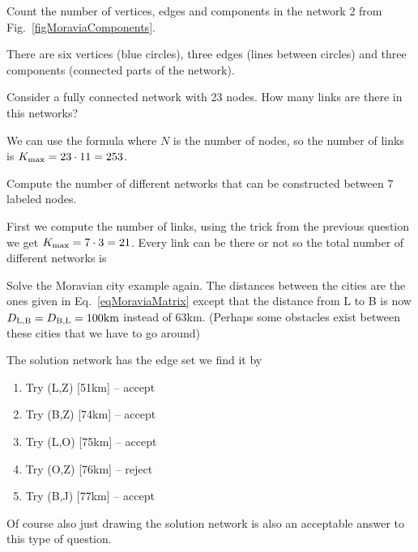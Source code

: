 

Count the number of vertices, edges and components in the network 2 from Fig.~\ref{figMoraviaComponents}. 

\solution
There are six vertices (blue circles), three edges (lines between circles) and three components (connected parts of the network). 



Consider a fully connected network with 23 nodes. How many links are there in this networks?


\solution
We can use the formula
where $N$ is the number of nodes, so the number of links is $K_{\rm max}=23\cdot 11 = 253$.



Compute the number of different networks that can be constructed between 7 labeled nodes.


\solution
First we compute the number of links, using the trick from the previous question we get $K_{\rm max}=7 \cdot 3=21$. Every link can be there or not so the total number of different networks is 







 Solve the Moravian city example again. The distances between the cities are the ones given in Eq.~\ref{eqMoraviaMatrix} except that the distance from L to B is now $D_{\rm L,\rm B}=D_{\rm B,\rm L}=100{\rm km}$ instead of 63km. (Perhaps some obstacles exist between these cities that we have to go around) 


\solution
The solution network has the edge set 
we find it by
\begin{enumerate}
    \item Try (L,Z) [51km] -- accept
    \item Try (B,Z) [74km] -- accept
    \item Try (L,O) [75km] -- accept
    \item Try (O,Z) [76km] -- reject
    \item Try (B,J) [77km] -- accept 
\end{enumerate}
Of course also just drawing the solution network is also an acceptable answer to this type of question.


